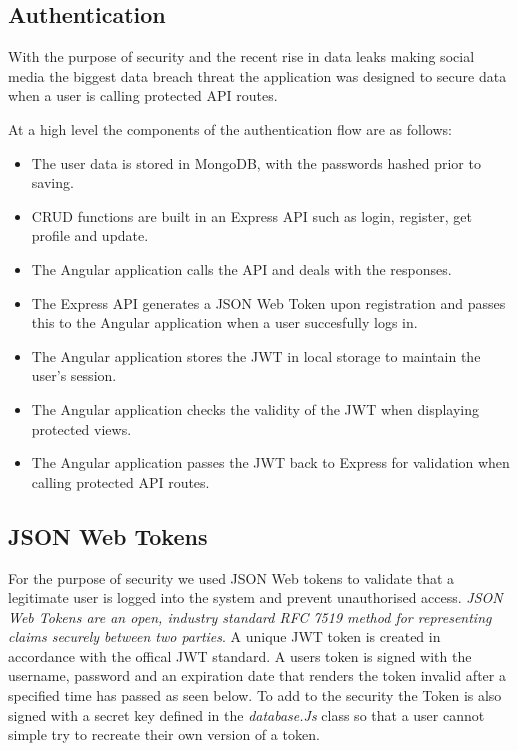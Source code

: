 \subsection{Authentication}
With the purpose of security and the recent rise in data leaks making social media the biggest data breach threat \cite{dataleaks} the application was designed to secure data when a user is calling protected API routes.

At a high level the components of the authentication flow are as follows:
\begin{itemize}
    \item The user data is stored in MongoDB, with the passwords hashed prior to saving.
    \item CRUD functions are built in an Express API such as login, register, get profile and update. 
    \item The Angular application calls the API and deals with the responses.
    \item The Express API generates a JSON Web Token upon registration and passes this to the Angular application when a user succesfully logs in.
    \item The Angular application stores the JWT in local storage to maintain the user’s session.
    \item The Angular application checks the validity of the JWT when displaying protected views.
    \item The Angular application passes the JWT back to Express for validation when calling protected API routes.
\end{itemize}
   

\subsection{JSON Web Tokens}
For the purpose of security we used JSON Web tokens to validate that a legitimate user is logged into the system and prevent unauthorised access. \textit{JSON Web Tokens are an open, industry standard RFC 7519 method for representing claims securely between two parties}\cite{jwt}. A unique JWT token is created in accordance with the offical JWT standard. A users token is signed with the username, password and an expiration date that renders the token invalid after a specified time has passed as seen below. To add to the security the Token is also signed with a secret key defined in the \textit{database.Js} class so that a user cannot simple try to recreate their own version of a token.


